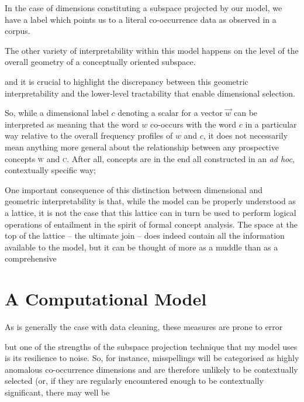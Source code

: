 In the case of dimensions constituting a subspace projected by our model, we have a label which points us to a literal co-occurrence data as observed in a corpus.

The other variety of interpretability within this model happens on the level of the overall geometry of a conceptually oriented subspace.

and it is crucial to highlight the discrepancy between this geometric interpretability and the lower-level tractability that enable dimensional selection.

So, while a dimensional label $c$ denoting a scalar for a vector $\overrightarrow{w}$ can be interpreted as meaning that the word $w$ co-occurs with the word $c$ in a particular way relative to the overall frequency profiles of $w$ and $c$, it does not necessarily mean anything more general about the relationship between any prospective concepts \textsc{w} and \textsc{c}.  After all, concepts are in the end all constructed in an \emph{ad hoc}, contextually specific way; 

One important consequence of this distinction between dimensional and geometric interpretability is that, while the model can be properly understood as a lattice, it is not the case that this lattice can in turn be used to perform logical operations of entailment in the spirit of  formal concept analysis.  The space at the top of the lattice -- the ultimate join -- does indeed contain all the information available to the model, but it can be thought of more as a muddle than as a comprehensive 

\section{A Computational Model}

As is generally the case with data cleaning, these measures are prone to error

but one of the strengths of the subspace projection technique that my model uses is its resilience to noise.  So, for instance, misspellings will be categorised as highly anomalous co-occurrence dimensions and are therefore unlikely to be contextually selected (or, if they are regularly encountered enough to be contextually significant, there may well be 
